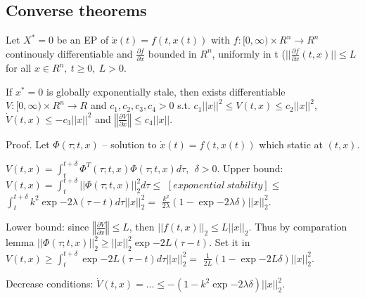 \subsection{Converse theorems}

 Let $X^*=0$ be an EP of $\dot x(t)=f(t,x(t))$ with $f:[0,\infty)\times R^n \to R^n$
 continously differentiable and $\frac{\partial f}{\partial x}$ bounded in $R^n$,
 uniformly in t ($||\frac{\partial f}{\partial x}(t,x)||\le L$ for all 
 $x\in R^n,\ t\ge 0,\ L>0$.

 If $x^*=0$ is globally exponentially stale, then exists differentiable 
 $V:[0,\infty)\times R^n\to R$ and $c_1,c_2,c_3,c_4>0$ s.t.
 $c_1||x||^2\le V(t,x)\le c_2||x||^2$, $\dot V(t,x)\le -c_3||x||^2$ and
 $\left\Vert \frac{\partial V}{\partial x}\right\Vert \le c_4||x||$.

Proof. Let $\Phi(\tau;t,x)$ -- solution to $\dot x(t)=f(t, x(t))$ which static
at $(t,x)$.

$V(t,x)=\int_t^{t+\delta}\Phi^T(\tau;t,x)\Phi(\tau;t,x) d\tau, \ \ \delta>0$.
Upper bound: $V(t,x)=\int_t^{t+\delta}||\Phi(\tau;t,x)||_2^2 d\tau\le$
$[exponential\ stability]\le$
$\int_t^{t+\delta}k^2\exp{-2\lambda(\tau-t)}d\tau ||x||_2^2 =$
$\frac{k^2}{2\lambda}(1-\exp{-2\lambda\delta})||x||_2^2$.

Lower bound: since $\left\Vert \frac{\partial V}{\partial x}\right\Vert \le L$, then
$||f(t,x)||_2\le L||x||_2$. Thus by comparation lemma 
$||\Phi(\tau;t,x)||_2^2\ge ||x||_2^2\exp{-2L(\tau-t)}$. Set it in 
$V(t,x)\ge \int_t^{t+\delta}\exp{-2L(\tau-t)} d\tau ||x||_2^2=$
$\frac{1}{2L}(1-\exp{-2L\delta})||x||_2^2$.

Decrease conditions: $\dot V(t,x)=\dots\le-(1-k^2\exp{-2\lambda\delta})||x||_2^2$.
